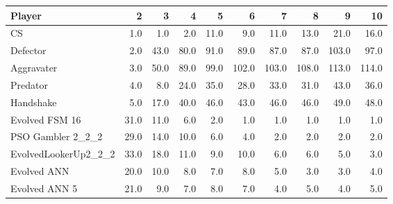 \begin{tabular}{lrrrrrrrrr}
\toprule
               Player &     2 &     3 &     4 &     5 &      6 &      7 &      8 &      9 &     10 \\
\midrule
                   CS &   1.0 &   1.0 &   2.0 &  11.0 &    9.0 &   11.0 &   13.0 &   21.0 &   16.0 \\
             Defector &   2.0 &  43.0 &  80.0 &  91.0 &   89.0 &   87.0 &   87.0 &  103.0 &   97.0 \\
           Aggravater &   3.0 &  50.0 &  89.0 &  99.0 &  102.0 &  103.0 &  108.0 &  113.0 &  114.0 \\
             Predator &   4.0 &   8.0 &  24.0 &  35.0 &   28.0 &   33.0 &   31.0 &   43.0 &   36.0 \\
            Handshake &   5.0 &  17.0 &  40.0 &  46.0 &   43.0 &   46.0 &   46.0 &   49.0 &   48.0 \\
       Evolved FSM 16 &  31.0 &  11.0 &   6.0 &   2.0 &    1.0 &    1.0 &    1.0 &    1.0 &    1.0 \\
    PSO Gambler 2\_2\_2 &  29.0 &  14.0 &  10.0 &   6.0 &    4.0 &    2.0 &    2.0 &    2.0 &    2.0 \\
 EvolvedLookerUp2\_2\_2 &  33.0 &  18.0 &  11.0 &   9.0 &   10.0 &    6.0 &    6.0 &    5.0 &    3.0 \\
          Evolved ANN &  20.0 &  10.0 &   8.0 &   7.0 &    8.0 &    5.0 &    3.0 &    3.0 &    4.0 \\
        Evolved ANN 5 &  21.0 &   9.0 &   7.0 &   8.0 &    7.0 &    4.0 &    5.0 &    4.0 &    5.0 \\
\bottomrule
\end{tabular}
